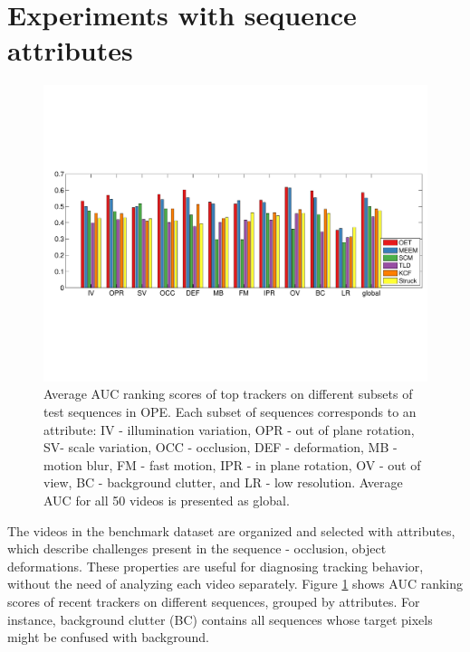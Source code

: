 \section{Experiments with sequence attributes}

\begin{figure}[h!]
\centering
\includegraphics[width=1.0\linewidth, trim= 0.2cm 6.15cm 0.2cm 5.8cm, clip=true]{Figures/bar_graph.pdf}
\caption[Average AUC ranking scores of top trackers on different subsets of test
sequences in OPE]
{\small Average AUC ranking scores of top trackers on different subsets of test
		sequences in OPE. Each subset of sequences corresponds to an attribute:
		IV - illumination variation, OPR - out of plane rotation, SV- scale
		variation, OCC - occlusion, DEF - deformation, MB - motion blur, FM -
		fast motion, IPR - in plane rotation, OV - out of view, BC - background
		clutter, and LR - low resolution. Average AUC for all 50 videos is
		presented as global.}
\label{fig:attributes}
\end{figure}

The videos in the benchmark dataset are organized and selected with attributes,
which describe challenges present in the sequence - \eg occlusion, object
deformations. These properties are useful for diagnosing tracking behavior,
without the need of analyzing each video separately. Figure \ref{fig:attributes}
shows AUC ranking scores of recent trackers on different sequences, grouped by
attributes. For instance, background clutter (BC) contains all sequences whose
target pixels might be confused with background.

